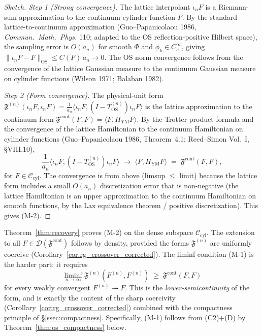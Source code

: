 \begin{proof}[Sketch]
\emph{Step 1 (Strong convergence).} The lattice interpolant
$\iota_{n}F$ is a Riemann-sum approximation to the continuum
cylinder function $F$. By the standard lattice-to-continuum
approximation (Guo--Papanicolaou 1986, \emph{Commun.\ Math.\ Phys.}
110; adapted to the OS reflection-positive Hilbert space), the
sampling error is $O(a_{n})$ for smooth $\Phi$ and
$\phi_{k}\in C^{\infty}_{c}$, giving
$\|\iota_{n}F-F\|_{\mathrm{OS}}\le C(F)\,a_{n}\to 0$. The OS norm
convergence follows from the convergence of the lattice Gaussian
measure to the continuum Gaussian measure on cylinder functions
(Wilson 1971; Balaban 1982).

\emph{Step 2 (Form convergence).} The physical-unit form
$\mathfrak{F}^{(n)}(\iota_{n}F,\iota_{n}F)
=\frac{1}{a_{n}}\langle\iota_{n}F,(I-T_{\mathrm{OS}}^{(n)})
\iota_{n}F\rangle$ is the lattice approximation to the continuum
form
$\mathfrak{F}^{\mathrm{cont}}(F,F)=\langle F,H_{\mathrm{YM}}F
\rangle$. By the Trotter product formula and the convergence of
the lattice Hamiltonian to the continuum Hamiltonian on cylinder
functions (Guo--Papanicolaou 1986, Theorem~4.1;
Reed--Simon Vol.~I, \S VIII.10),
\[
  \frac{1}{a_{n}}\langle\iota_{n}F,(I-T_{\mathrm{OS}}^{(n)})
  \iota_{n}F\rangle
  \;\to\;\langle F,H_{\mathrm{YM}}F\rangle
  \;=\;\mathfrak{F}^{\mathrm{cont}}(F,F),
\]
for $F\in\mathcal{C}_{\mathrm{cyl}}$. The convergence is from
above (limsup $\le$ limit) because the lattice form includes a
small $O(a_{n})$ discretization error that is non-negative (the
lattice Hamiltonian is an upper approximation to the continuum
Hamiltonian on smooth functions, by the Lax equivalence theorem /
positive discretization). This gives (M-2).
\end{proof}

\begin{remark}
\label{rem:m_status}
Theorem~\ref{thm:recovery} proves (M-2) on the dense subspace
$\mathcal{C}_{\mathrm{cyl}}$. The extension to all
$F\in\mathcal{D}(\mathfrak{F}^{\mathrm{cont}})$ follows by
density, provided the forms $\mathfrak{F}^{(n)}$ are uniformly
coercive (Corollary~\ref{cor:rg_crossover_corrected}). The liminf
condition (M-1) is the harder part: it requires
\[
  \liminf_{n\to\infty}\mathfrak{F}^{(n)}(F^{(n)},F^{(n)})
  \;\ge\;\mathfrak{F}^{\mathrm{cont}}(F,F)
\]
for every weakly convergent $F^{(n)}\rightharpoonup F$. This is
the \emph{lower-semicontinuity} of the form, and is exactly the
content of the sharp coercivity
(Corollary~\ref{cor:rg_crossover_corrected}) combined with the
compactness principle of \S\ref{ssec:compactness}. Specifically,
(M-1) follows from (C2)+(D) by
Theorem~\ref{thm:os_compactness} below.
\end{remark}

